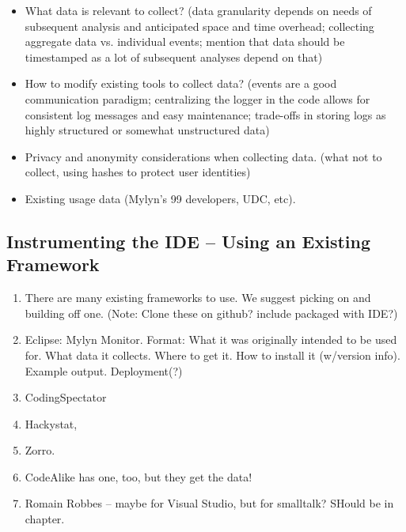     \begin{itemize}
\item
      What data is relevant to collect? (data granularity depends on needs of subsequent analysis and anticipated space and time overhead; collecting aggregate data vs. individual events; mention that data should be timestamped as a lot of subsequent analyses depend on that)
    \item
      How to modify existing tools to collect data? (events are a good communication paradigm; centralizing the logger in the code allows for consistent log messages and easy maintenance; trade-offs in storing logs as highly structured or somewhat unstructured data)
    \item
      Privacy and anonymity considerations when collecting data. (what not to collect, using hashes to protect user identities)
      
     
    \item
    	Existing usage data (Mylyn's 99 developers, UDC, etc). %
     
    \end{itemize}

\subsection{Instrumenting the IDE -- Using an Existing Framework} %
  
\begin{enumerate}
	\item 
	There are many existing frameworks to use. We suggest picking on and building off one. (Note: Clone these on github? include packaged with IDE?)
	
	\item Eclipse: Mylyn Monitor. Format: What it was originally intended to be used for. What data it collects. Where to get it. How to install it (w/version info). Example output. Deployment(?)
	
	\item CodingSpectator %
	
	\item Hackystat\cite{V:johnson2003beyond}, %

	\item Zorro\cite{Kou2010Operational}. %
	
	\item CodeAlike has one, too, but they get the data!
	
	\item Romain Robbes -- maybe for Visual Studio, but for smalltalk? SHould be in chapter.
\end{enumerate}


